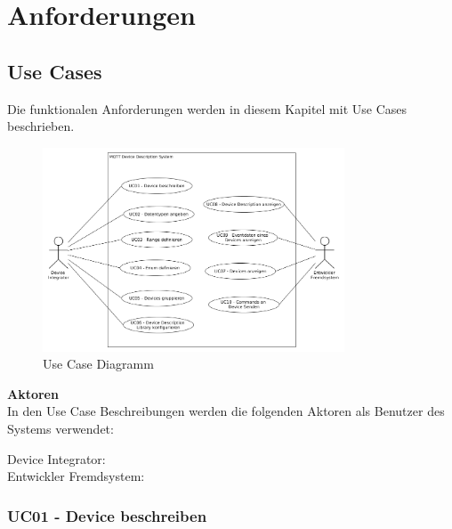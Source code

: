 \chapter{Anforderungen}
\label{chap:requirements}

\section{Use Cases}
Die funktionalen Anforderungen werden in diesem Kapitel mit Use Cases beschrieben.

\begin{figure}[H]
	\centering
		\includegraphics[width=0.8\textwidth]{diag/use_cases.png}
	\caption{Use Case Diagramm}
\end{figure}
\textbf{Aktoren} \\
In den Use Case Beschreibungen werden die folgenden Aktoren als Benutzer des Systems verwendet:

Device Integrator:       \\
Entwickler Fremdsystem:  \\

\subsection{UC01 - Device beschreiben}

